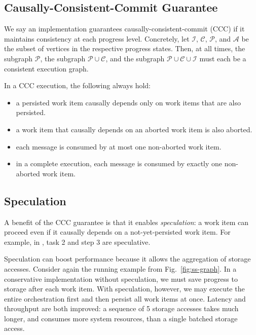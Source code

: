 \subsection{Causally-Consistent-Commit Guarantee}\label{sec:consistencyguarantees}

We say an implementation guarantees causally-consistent-commit (CCC) if it maintains consistency at each progress level. Concretely, let $\mathcal{I}$, $\mathcal{C}$, $\mathcal{P}$, and $\mathcal{A}$ be the subset of vertices in the respective progress states. Then, at all times, the subgraph $\mathcal{P}$, the subgraph $\mathcal{P}\cup\mathcal{C}$, and the subgraph $\mathcal{P}\cup\mathcal{C}\cup\mathcal{I}$ must each be a consistent execution graph.

In a CCC execution, the following always hold:
\begin{itemize}
\item a persisted work item causally depends only on work items that are also persisted.
\item a work item that causally depends on an aborted work item is also aborted.
\item each message is consumed by at most one non-aborted work item.
\item in a complete execution, each message is consumed by exactly one non-aborted work item.
\end{itemize}



\subsection{Speculation}\label{sec:defspeculation}

A benefit of the CCC guarantee is that it enables \emph{speculation}: a work item can proceed even if it causally depends on a not-yet-persisted work item. For example, in , task 2 and step 3 are speculative. 

Speculation can boost performance because it allows the aggregation of storage accesses. Consider again the running example from Fig.~\ref{fig:ss-graph}. In a conservative implementation without speculation, we must save progress to storage after each work item. With speculation, however, we may execute the entire orchestration first and then persist all work items at once. Latency and throughput are both improved: a sequence of 5 storage accesses takes much longer, and consumes more system resources, than a single batched storage access.

